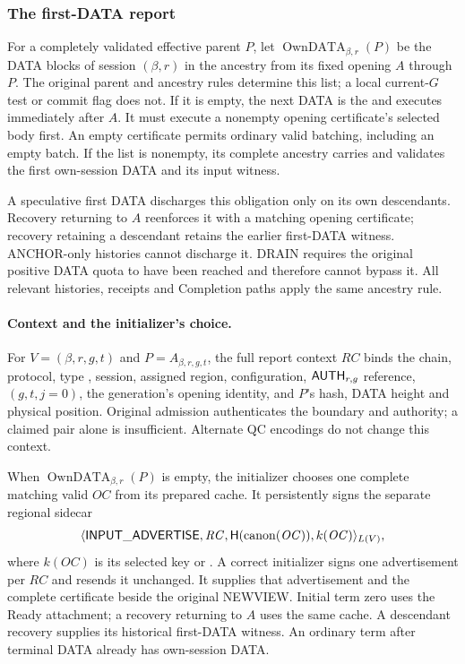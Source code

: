 



\subsubsection{The first-DATA report}
\label{sec:input-report}
For a completely validated effective parent $P$, let
$\operatorname{OwnDATA}_{\beta,r}(P)$ be the DATA blocks of session
$(\beta,r)$ in the ancestry from its fixed opening $A$ through $P$.
The original parent and ancestry rules determine this list; a local
current-$G$ test or commit flag does not. If it is empty, the next DATA
is the  and executes immediately after
$A$. It must execute a nonempty opening certificate's selected body
first. An empty certificate permits ordinary valid batching, including
an empty batch. If the list is nonempty, its complete ancestry carries
and validates the first own-session DATA and its input witness.

A speculative first DATA discharges this obligation only on its own
descendants. Recovery returning to $A$ reenforces it with a matching
opening certificate; recovery retaining a descendant retains the earlier
first-DATA witness. ANCHOR-only histories cannot discharge it. DRAIN
requires the original positive DATA quota to have been reached and
therefore cannot bypass it. All relevant histories, receipts and
Completion paths apply the same ancestry rule.

\paragraph{Context and the initializer's choice.}
For $V=(\beta,r,g,t)$ and $P=A_{\beta,r,g,t}$, the full report context
$\mathit{RC}$ binds the chain, protocol, type , session,
assigned region, configuration, $\mathsf{AUTH}_{r,g}$ reference,
$(g,t,j=0)$, the generation's opening identity, and $P$'s hash, DATA height
and physical position. Original admission authenticates the boundary and
authority; a claimed pair alone is insufficient. Alternate QC encodings
do not change this context.

When $\operatorname{OwnDATA}_{\beta,r}(P)$ is empty, the initializer
chooses one complete matching valid $\mathit{OC}$ from its prepared cache.
It persistently signs the separate regional sidecar
\[
 \langle\mathsf{INPUT\_ADVERTISE},\mathit{RC},
    \mathsf H(\operatorname{canon}(\mathit{OC})),k(\mathit{OC})\rangle_{L(V)},
\]
where $k(\mathit{OC})$ is its selected key or .
A correct initializer signs one advertisement per $\mathit{RC}$ and
resends it unchanged. It supplies that advertisement and the complete
certificate beside the original NEWVIEW. Initial term zero uses the
Ready attachment; a recovery returning to $A$ uses the same cache.
A descendant recovery supplies its historical first-DATA witness.
An ordinary term after terminal DATA already has own-session DATA.

